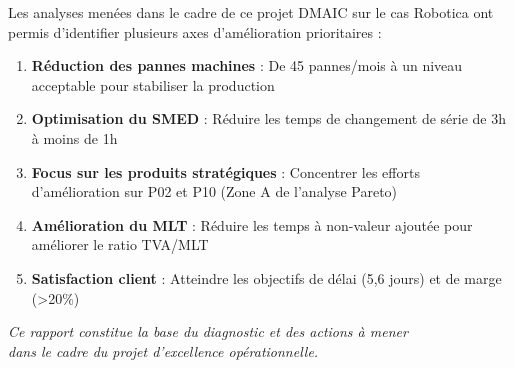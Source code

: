 \documentclass[11pt,a4paper]{article}
\begin{document}
Les analyses menées dans le cadre de ce projet DMAIC sur le cas Robotica ont permis d'identifier plusieurs axes d'amélioration prioritaires :

\begin{enumerate}[leftmargin=*,itemsep=0.5em]
  \item \textbf{Réduction des pannes machines} : De 45 pannes/mois à un niveau acceptable pour stabiliser la production
  
  \item \textbf{Optimisation du SMED} : Réduire les temps de changement de série de 3h à moins de 1h
  
  \item \textbf{Focus sur les produits stratégiques} : Concentrer les efforts d'amélioration sur P02 et P10 (Zone A de l'analyse Pareto)
  
  \item \textbf{Amélioration du MLT} : Réduire les temps à non-valeur ajoutée pour améliorer le ratio TVA/MLT
  
  \item \textbf{Satisfaction client} : Atteindre les objectifs de délai (5,6 jours) et de marge (>20\%)
\end{enumerate}

\vspace{1cm}

\begin{center}
\textit{Ce rapport constitue la base du diagnostic et des actions à mener\\
dans le cadre du projet d'excellence opérationnelle.}
\end{center}
\end{document}
